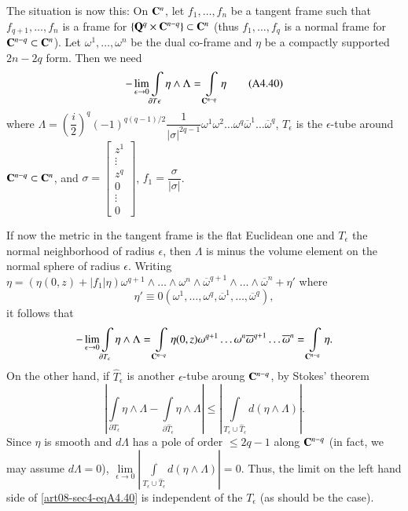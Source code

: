 The situation is now this: On $\mathbf{C}^{n}$, let $f_{1},\ldots,f_{n}$ be a tangent frame such that $f_{q+1},\ldots,f_{n}$ is a frame for $\{\mathbf{Q}^{q}\times \mathbf{C}^{n-q}\}\subset \mathbf{C}^{n}$ (thus $f_{1},\ldots,f_{q}$ is a normal frame for $\mathbf{C}^{n-q}\subset \mathbf{C}^{n}$). Let $\omega^{1},\ldots,\omega^{n}$ be the dual co-frame and $\eta$ be a compactly supported $2n-2q$ form. Then we need
\begin{equation*}
-\lim\limits_{\epsilon \to 0}\int\limits_{\partial T\epsilon}\eta \wedge \Lambda=\int\limits_{\mathbf{C}^{n-q}}\eta\tag{A4.40}\label{art08-sec4-eqA4.40}
\end{equation*}
where $\Lambda =\left(\dfrac{i}{2}\right)^{q}(-1)^{q(q-1)/2}\dfrac{1}{|\sigma|^{2q-1}}\omega^{1}\omega^{2}\ldots\omega^{q}\overline{\omega}^{1}\ldots\overline{\omega}^{q}$, $T_{\epsilon}$ is the $\epsilon$-tube around $\mathbf{C}^{n-q}\subset \mathbf{C}^{n}$, and $\sigma=\left[\begin{smallmatrix} z^{1}\\\vdots\\z^{q}\\0\\\vdots\\0\end{smallmatrix}\right]$, $f_{1}=\dfrac{\sigma}{|\sigma|}$.

If now the metric in the tangent frame is the flat Euclidean one and $T_{\epsilon}$ the normal neighborhood of radius $\epsilon$, then $\Lambda$ is minus the volume element on the normal sphere of radius $\epsilon$. Writing $\eta=(\eta(0,z)+|f_{1}|\widehat{\eta})\omega^{q+1}\wedge\ldots\wedge \omega^{n}\wedge \overline{\omega}^{q+1}\wedge\ldots\wedge\overline{\omega}^{n}+\eta'$ where 
$$
\eta'\equiv 0(\omega^{1},\ldots,\omega^{q},\overline{\omega}^{1},\ldots,\overline{\omega}^{q}),
$$ 
it follows that
$$
-\lim\limits_{\epsilon\to 0}\int\limits_{\partial T_{\epsilon}}\eta \wedge \Lambda =\int\limits_{\mathbf{C}^{n-q}}\eta(0,z)\omega^{q+1}\ldots\omega^{n}\overline{\omega}^{q+1}\ldots\overline{\omega}^{n}=\int\limits_{\mathbf{C}^{n-q}}\eta.
$$ 
On the other hand, if $\widehat{T}_{\epsilon}$ is another $\epsilon$-tube aroung $\mathbf{C}^{n-q}$, by Stokes' theorem
$$
|\int\limits_{\partial T_{\epsilon}}\eta \wedge \Lambda-\int\limits_{\partial \widehat{T}_{\epsilon}}\eta \wedge \Lambda |\leq |\int\limits_{T_{\epsilon}\cup \widehat{T}_{\epsilon}}d(\eta\wedge\Lambda)|.
$$
Since $\eta$ is smooth and $d\Lambda$ has a pole of order $\leq 2q-1$ along $\mathbf{C}^{n-q}$ (in fact, we may assume $d\Lambda=0$), $\lim\limits_{\epsilon\to 0}|\int\limits_{T_{\epsilon}\cup \widehat{T}_{\epsilon}}d(\eta\wedge\Lambda)|=0$. Thus, the limit on the left hand side of \eqref{art08-sec4-eqA4.40} is independent of the $T_{\epsilon}$ (as should be the case).

